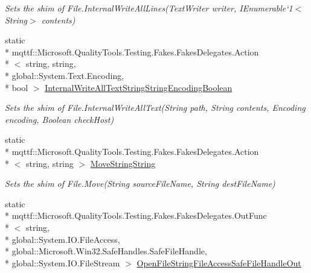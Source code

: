 \begin{DoxyCompactItemize}
\begin{DoxyCompactList}\small\item\em Sets the shim of File.\-Internal\-Write\-All\-Lines(Text\-Writer writer, I\-Enumerable`1$<$String$>$ contents)\end{DoxyCompactList}\item 
static \\*
mqttf\-::\-Microsoft.\-Quality\-Tools.\-Testing.\-Fakes.\-Fakes\-Delegates.\-Action\\*
$<$ string, string, \\*
global\-::\-System.\-Text.\-Encoding, \\*
bool $>$ \hyperlink{class_system_1_1_i_o_1_1_fakes_1_1_shim_file_a9599736d3017943dcafa9ff3998dd43c}{Internal\-Write\-All\-Text\-String\-String\-Encoding\-Boolean}
\begin{DoxyCompactList}\small\item\em Sets the shim of File.\-Internal\-Write\-All\-Text(\-String path, String contents, Encoding encoding, Boolean check\-Host)\end{DoxyCompactList}\item 
static \\*
mqttf\-::\-Microsoft.\-Quality\-Tools.\-Testing.\-Fakes.\-Fakes\-Delegates.\-Action\\*
$<$ string, string $>$ \hyperlink{class_system_1_1_i_o_1_1_fakes_1_1_shim_file_a6face77ff415bf6ad882d0fcdf91b031}{Move\-String\-String}
\begin{DoxyCompactList}\small\item\em Sets the shim of File.\-Move(\-String source\-File\-Name, String dest\-File\-Name)\end{DoxyCompactList}\item 
static \\*
mqttf\-::\-Microsoft.\-Quality\-Tools.\-Testing.\-Fakes.\-Fakes\-Delegates.\-Out\-Func\\*
$<$ string, \\*
global\-::\-System.\-I\-O.\-File\-Access, \\*
global\-::\-Microsoft.\-Win32.\-Safe\-Handles.\-Safe\-File\-Handle, \\*
global\-::\-System.\-I\-O.\-File\-Stream $>$ \hyperlink{class_system_1_1_i_o_1_1_fakes_1_1_shim_file_aa5828e46b5a2fc5593c4e9beae63ff7b}{Open\-File\-String\-File\-Access\-Safe\-File\-Handle\-Out}

\end{DoxyCompactItemize}
